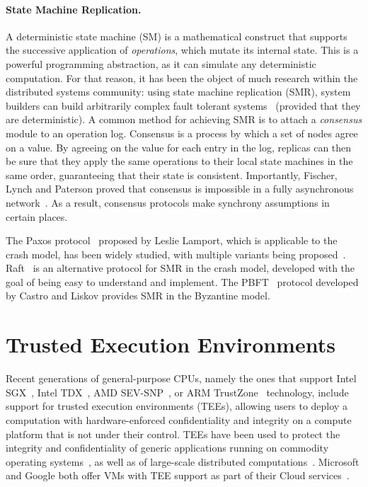 \paragraph{State Machine Replication.} A deterministic state machine (SM) is a
mathematical construct that supports the successive application of
\emph{operations}, which mutate its internal state. This is a
powerful programming abstraction, as it can simulate any
deterministic computation. For that reason, it has been the
object of much research within the distributed systems community:
using state machine replication (SMR), system builders can build
arbitrarily complex fault tolerant systems~\cite{schneider-smr} (provided that they
are deterministic). A common method for achieving SMR is to
attach a \emph{consensus} module to an operation log. Consensus
is a process by which a set of nodes agree on a value. By agreeing
on the value for each entry in the log, replicas can then be sure
that they apply the same operations to their local state machines in the same order,
guaranteeing that their state is consistent. Importantly,
Fischer, Lynch and Paterson proved that consensus is impossible
in a fully asynchronous network~\cite{flp}. As a result,
consensus protocols make synchrony assumptions in certain places.

The Paxos protocol~\cite{paxos} proposed by Leslie Lamport, which
is applicable to the crash model, has been widely studied, with
multiple variants being
proposed~\cite{fp,fast-paxos,egalitarian-paxos,disk-paxos,paxos_builders}.
Raft~\cite{raft} is an alternative protocol for SMR in the crash
model, developed with the goal of being easy to understand and
implement. The PBFT~\cite{pbft} protocol developed by Castro and
Liskov provides SMR in the Byzantine model.

\section{Trusted Execution Environments}
Recent generations of general-purpose CPUs, namely the ones that
support Intel SGX~\cite{intelsgx}, Intel TDX~\cite{inteltdx}, AMD
SEV-SNP~\cite{amdsev,amdsev-snp}, or ARM TrustZone~\cite{armTZ}
technology, include support for trusted execution environments (TEEs),
allowing users to deploy a computation with hardware-enforced
confidentiality and integrity on a compute platform that is not under
their control.  TEEs have been used to protect the integrity and
confidentiality of generic applications running on commodity operating
systems~\cite{haven}, as well as of large-scale distributed
computations~\cite{vc3}. Microsoft and Google both offer VMs with TEE
support as part of their Cloud
services~\cite{azure-conf,google-confVM}.

